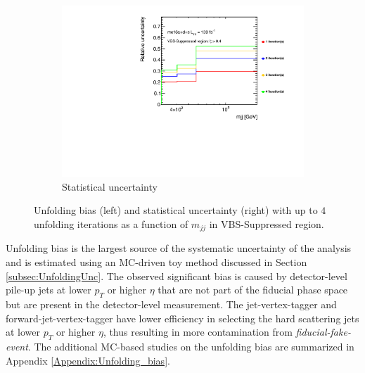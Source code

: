 \begin{figure}[htb]
\begin{subfigure}{.49\textwidth}
        \centering
        \includegraphics[width=.95\linewidth]{figures/Analysis/Unfolding/StatUnc_Sup.pdf}
        \caption{ Statistical uncertainty \label{fig:UnfoldingStatUnc}}
    \end{subfigure}
    \caption{ Unfolding bias (left) and statistical uncertainty (right) with up to $4$ unfolding iterations as a function of $m_{jj}$ in VBS-Suppressed region. \label{fig:BiasStatUnc}}
\end{figure}

Unfolding bias is the largest source of the systematic uncertainty of the analysis and is estimated using an MC-driven toy method discussed in Section \ref{subsec:UnfoldingUnc}. The observed significant bias is caused by detector-level pile-up jets at lower $p_{T}$ or higher $\eta$ that are not part of the fiducial phase space but are present in the detector-level measurement. The jet-vertex-tagger and forward-jet-vertex-tagger have lower efficiency in selecting the hard scattering jets at lower $p_{T}$ or higher $\eta$, thus resulting in more contamination from \textit{fiducial-fake-event}. The additional MC-based studies on the unfolding bias are summarized in Appendix \ref{Appendix:Unfolding_bias}. 
